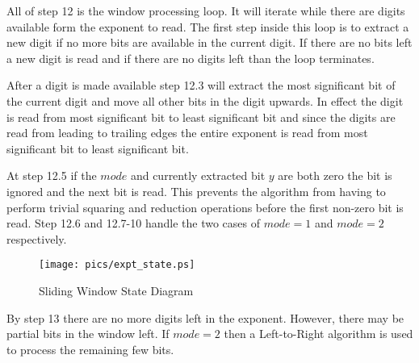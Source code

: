 \documentclass[b5paper]{book}
\begin{document}
All of step 12 is the window processing loop.  It will iterate while there are digits available form the exponent to read.  The first step
inside this loop is to extract a new digit if no more bits are available in the current digit.  If there are no bits left a new digit is
read and if there are no digits left than the loop terminates.  

After a digit is made available step 12.3 will extract the most significant bit of the current digit and move all other bits in the digit
upwards.  In effect the digit is read from most significant bit to least significant bit and since the digits are read from leading to 
trailing edges the entire exponent is read from most significant bit to least significant bit.

At step 12.5 if the $mode$ and currently extracted bit $y$ are both zero the bit is ignored and the next bit is read.  This prevents the 
algorithm from having to perform trivial squaring and reduction operations before the first non-zero bit is read.  Step 12.6 and 12.7-10 handle
the two cases of $mode = 1$ and $mode = 2$ respectively.  

\begin{center}
\begin{figure}[here]
\texttt{[image: pics/expt\_state.ps]}
\caption{Sliding Window State Diagram}
\label{pic:expt_state}
\end{figure}
\end{center}

By step 13 there are no more digits left in the exponent.  However, there may be partial bits in the window left.  If $mode = 2$ then 
a Left-to-Right algorithm is used to process the remaining few bits.  
\end{document}
